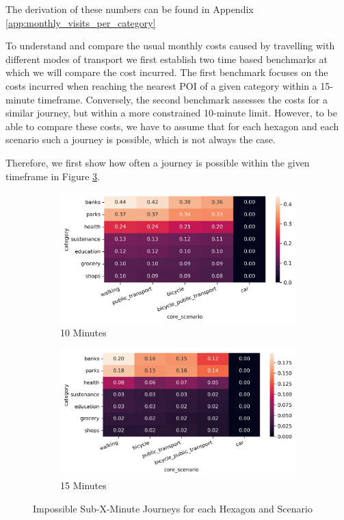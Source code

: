 The derivation of these numbers can be found in Appendix \ref{app:monthly_visits_per_category}

To understand and compare the usual monthly costs caused by travelling with different modes of transport we first establish two time based benchmarks at which we will compare the cost incurred.
The first benchmark focuses on the costs incurred when reaching the nearest POI of a given category within a 15-minute timeframe. 
Conversely, the second benchmark assesses the costs for a similar journey, but within a more constrained 10-minute limit.
However, to be able to compare these costs, we have to assume that for each hexagon and each scenario such a journey is possible, which is not always the case.

Therefore, we first show how often a journey is possible within the given timeframe in Figure \ref{fig:percentage_inf_x}.

\begin{figure}
  \centering
  \begin{subfigure}[b]{0.45\textwidth}
    \centering
    \includegraphics[width=\textwidth]{Figures/results/monthly_costs/percentage_inf_10.png}
    \caption{10 Minutes}
    \label{fig:percentage_inf_10}
  \end{subfigure}
  \hfill
  \begin{subfigure}[b]{0.45\textwidth}
    \centering
    \includegraphics[width=\textwidth]{Figures/results/monthly_costs/percentage_inf_15.png}
    \caption{15 Minutes}
    \label{fig:percentage_inf_15}
  \end{subfigure}
  \caption{Impossible Sub-X-Minute Journeys for each Hexagon and Scenario}
  \label{fig:percentage_inf_x}
\end{figure}

